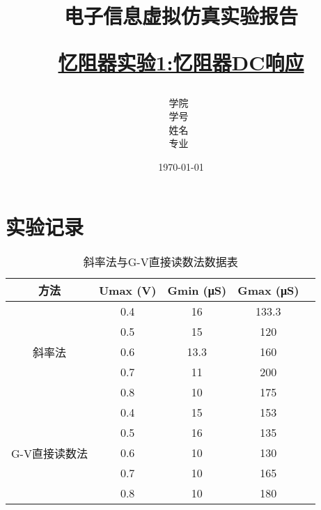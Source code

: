 \documentclass[12pt,hyperref,a4paper,UTF8]{ctexart}
\title{ 
        \vspace{1cm}
        \heiti \Huge \textbf{电子信息虚拟仿真实验报告} \par
        \vspace{1cm} 
        \heiti \Large {\underline{忆阻器实验1:忆阻器DC响应}   } 
        \vspace{3cm}
    
    }
\author{
        \vspace{0.5cm}
        \kaishu\Large 学院\ \dlmu[9cm]{卓越学院} \\ %
        \vspace{0.5cm}
        \kaishu\Large 学号\ \dlmu[9cm]{23040447} \\ %
        \vspace{0.5cm}
        \kaishu\Large 姓名\ \dlmu[9cm]{陈文轩} \qquad  \\ %
        \vspace{0.5cm}
        \kaishu\Large 专业\ \dlmu[9cm]{智能硬件与系统(电子信息工程)} \qquad \\ %
    }
\date{\today} %
\begin{document}
\cover
\thispagestyle{empty} %







\newpage
\setcounter{page}{1} %


\section{实验记录}




\begin{table}[H]
    \centering
    \caption{斜率法与G-V直接读数法数据表}
    \begin{tabular}{|c|c|c|c|c|}
    \hline
    \textbf{方法} & \textbf{Umax (V)} & \textbf{Gmin (μS)} & \textbf{Gmax (μS)} \\ \hline
    \multirow{5}{*}{斜率法} & 0.4 & 16& 133.3 \\ \cline{2-4}
                            & 0.5 & 15& 120\\ \cline{2-4}
                            & 0.6 & 13.3& 160\\ \cline{2-4}
                            & 0.7 & 11& 200\\ \cline{2-4}
                            & 0.8 & 10& 175\\ \hline
    \multirow{5}{*}{G-V直接读数法} & 0.4&15& 153 \\ \cline{2-4}
                                  & 0.5 &16 &135 \\ \cline{2-4}
                                  & 0.6 &10&130 \\ \cline{2-4}
                                  & 0.7 &10&165 \\ \cline{2-4}
                                  & 0.8 &10&180 \\ \hline
    \end{tabular}
    \label{tab:methods}
\end{table}
\end{document}
